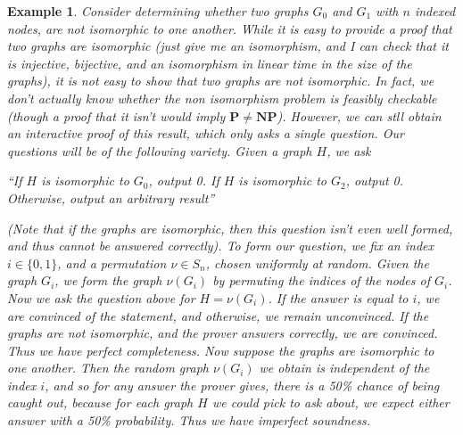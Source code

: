 \documentclass{article}
\theoremstyle{plain}
\newtheorem*{example}{Example}
\theoremstyle{definition}
\begin{document}
\begin{example}
    Consider determining whether two graphs $G_0$ and $G_1$ with $n$ indexed nodes, are {\it not} isomorphic to one another. While it is easy to provide a proof that two graphs are isomorphic (just give me an isomorphism, and I can check that it is injective, bijective, and an isomorphism in linear time in the size of the graphs), it is {\it not} easy to show that two graphs are not isomorphic. In fact, we don't actually know whether the non isomorphism problem is feasibly checkable (though a proof that it isn't would imply $\mathbf{P} \neq \mathbf{NP}$). However, we can stll obtain an interactive proof of this result, which only asks a single question. Our questions will be of the following variety. Given a graph $H$, we ask
    \begin{center} ``If $H$ is isomorphic to $G_0$, output 0. If $H$ is isomorphic to $G_2$, output 0. Otherwise, output an arbitrary result'' \end{center}
    (Note that if the graphs are isomorphic, then this question isn't even well formed, and thus cannot be answered correctly). To form our question, we fix an index $i \in \{ 0, 1 \}$, and a permutation $\nu \in S_n$, chosen uniformly at random. Given the graph $G_i$, we form the graph $\nu(G_i)$ by permuting the indices of the nodes of $G_i$. Now we ask the question above for $H = \nu(G_i)$. If the answer is equal to $i$, we are convinced of the statement, and otherwise, we remain unconvinced. If the graphs are not isomorphic, and the prover answers correctly, we are convinced. Thus we have perfect completeness. Now suppose the graphs are isomorphic to one another. Then the random graph $\nu(G_i)$ we obtain is independent of the index $i$, and so for any answer the prover gives, there is a 50\% chance of being caught out, because for each graph $H$ we could pick to ask about, we expect either answer with a 50\% probability. Thus we have imperfect soundness.
\end{example}
\end{document}
